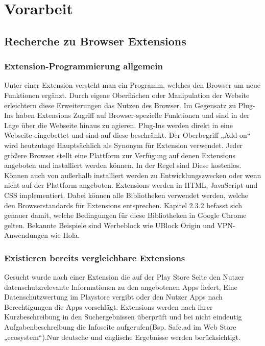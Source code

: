 \chapter{Vorarbeit}
\label{c:vorarbeit}


\section{Recherche zu Browser Extensions}
\label{s:recherchebrowserextensions}

\subsection{Extension-Programmierung allgemein}
\label{ss:extensionprogallg}

Unter einer Extension versteht man ein Programm, welches den Browser um neue Funktionen ergänzt. Durch eigene Oberflächen oder Manipulation der Website erleichtern diese Erweiterungen das Nutzen des Browser. 
Im Gegensatz zu Plug-Ins haben Extensions Zugriff auf Browser-spezielle Funktionen und sind in der Lage über die Webseite hinaus zu agieren. Plug-Ins werden direkt in eine Webseite eingebettet und sind auf diese beschränkt. Der Oberbegriff „Add-on“ wird heutzutage Hauptsächlich als Synonym für Extension verwendet.
Jeder größere Browser stellt eine Plattform zur Verfügung auf denen Extensions angeboten und installiert werden können. In der Regel sind Diese kostenlos. Können auch von außerhalb installiert werden zu Entwicklungszwecken oder wenn nicht auf der Plattform angeboten.
Extensions werden in HTML, JavaScript und CSS implementiert. Dabei können alle Bibliotheken verwendet werden, welche den Browserstandards für Extensions entsprechen. Kapitel 2.3.2 befasst sich genauer damit, welche Bedingungen für diese Bibliotheken in Google Chrome gelten.
Bekannte Beispiele sind Werbeblock wie UBlock Origin und VPN-Anwendungen wie Hola.

\subsection{Existieren bereits vergleichbare Extensions}
\label{ss:vergleichbareextensions}

Gesucht wurde nach einer Extension die auf der Play Store Seite den Nutzer datenschutzrelevante Informationen zu den angebotenen Apps liefert, Eine Datenschutzwertung im Playstore vergibt oder den Nutzer Apps nach Berechtigungen die Apps vorschlägt.
Extensions werden nach ihrer Kurzbeschreibung in den Suchergebnissen überprüft und bei nicht eindeutig Aufgabenbeschreibung die Infoseite aufgerufen(Bsp. Safe.ad im Web Store „ecosystem“).Nur deutsche und englische  Ergebnisse werden berücksichtigt.

